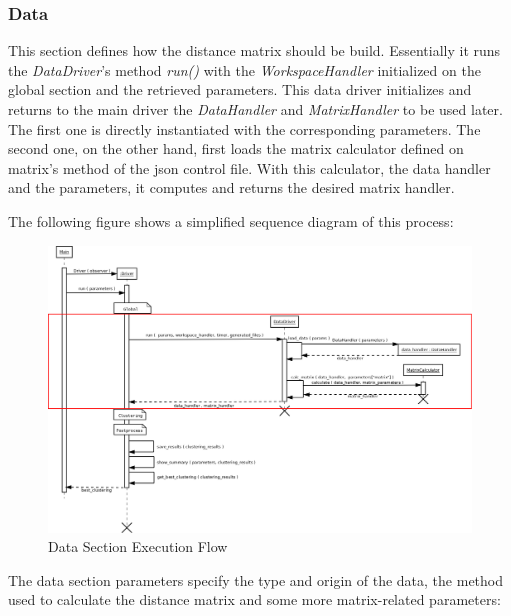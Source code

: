 \subsubsection{Data}

This section defines how the distance matrix should be build. Essentially it runs the \textit{DataDriver}'s method \textit{run()} with the \textit{WorkspaceHandler} initialized on the global section and the retrieved parameters. This data driver initializes and returns to the main driver the \textit{DataHandler} and \textit{MatrixHandler} to be used later. The first one is directly instantiated with the corresponding parameters. The second one, on the other hand, first loads the matrix calculator defined on matrix's method of the json control file. With this calculator, the data handler and the parameters, it computes and returns the desired matrix handler. 

The following figure shows a simplified sequence diagram of this process:

\begin{landscape}
\begin{figure}
\includegraphics[width=24cm]{img/data_sequence_driver.png}
\caption{Data Section Execution Flow}
\end{figure}
\end{landscape}



The data section parameters specify the type and origin of the data, the method used to calculate the distance matrix and some more matrix-related parameters:



